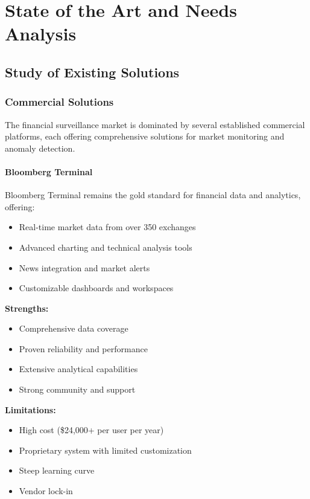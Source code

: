 \chapter{State of the Art and Needs Analysis}

\section{Study of Existing Solutions}

\subsection{Commercial Solutions}

The financial surveillance market is dominated by several established commercial platforms, each offering comprehensive solutions for market monitoring and anomaly detection.

\subsubsection{Bloomberg Terminal}

Bloomberg Terminal remains the gold standard for financial data and analytics, offering:
\begin{itemize}
    \item Real-time market data from over 350 exchanges
    \item Advanced charting and technical analysis tools
    \item News integration and market alerts
    \item Customizable dashboards and workspaces
\end{itemize}

\textbf{Strengths:}
\begin{itemize}
    \item Comprehensive data coverage
    \item Proven reliability and performance
    \item Extensive analytical capabilities
    \item Strong community and support
\end{itemize}

\textbf{Limitations:}
\begin{itemize}
    \item High cost (\$24,000+ per user per year)
    \item Proprietary system with limited customization
    \item Steep learning curve
    \item Vendor lock-in
\end{itemize}

